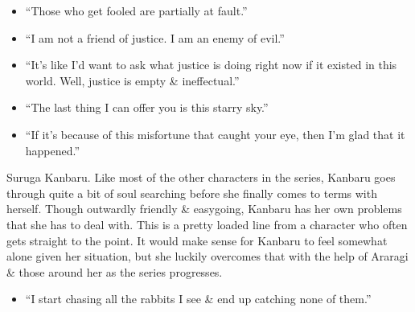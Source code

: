\documentclass{article}
\begin{document}
\begin{enumerate}
    \begin{itemize}
    	\item ``Those who get fooled are partially at fault.''
    	\item ``I am not a friend of justice. I am an enemy of evil.''
    	\item ``It's like I'd want to ask what justice is doing right now if it existed in this world. Well, justice is empty \& ineffectual.''
    	\item ``The last thing I can offer you is this starry sky.''
    	\item ``If it's because of this misfortune that caught your eye, then I'm glad that it happened.''
    \end{itemize}
    {\sf Suruga Kanbaru.} Like most of the other characters in the series, Kanbaru goes through quite a bit of soul searching before she finally comes to terms with herself. Though outwardly friendly \& easygoing, Kanbaru has her own problems that she has to deal with. This is a pretty loaded line from a character who often gets straight to the point. It would make sense for Kanbaru to feel somewhat alone given her situation, but she luckily overcomes that with the help of Araragi \& those around her as the series progresses.
    \begin{itemize}
    	\item ``I start chasing all the rabbits I see \& end up catching none of them.''

\end{itemize}
\end{enumerate}
\end{document}
